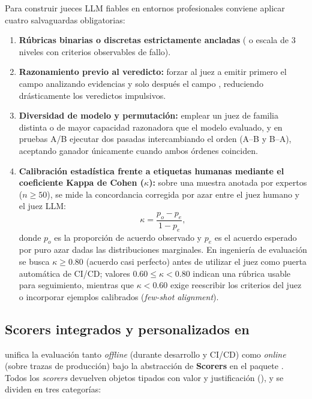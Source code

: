 \begin{infobox}
Para construir jueces LLM fiables en entornos profesionales conviene aplicar cuatro salvaguardas obligatorias:
\begin{enumerate}
  \item \textbf{Rúbricas binarias o discretas estrictamente ancladas} ( o escala de 3 niveles con criterios observables de fallo).
  \item \textbf{Razonamiento previo al veredicto:} forzar al juez a emitir primero el campo  analizando evidencias y solo después el campo , reduciendo drásticamente los veredictos impulsivos.
  \item \textbf{Diversidad de modelo y permutación:} emplear un juez de familia distinta o de mayor capacidad razonadora que el modelo evaluado, y en pruebas A/B ejecutar dos pasadas intercambiando el orden (A--B y B--A), aceptando ganador únicamente cuando ambos órdenes coinciden.
  \item \textbf{Calibración estadística frente a etiquetas humanas mediante el coeficiente Kappa de Cohen ($\kappa$):} sobre una muestra anotada por expertos ($n \ge 50$), se mide la concordancia corregida por azar entre el juez humano y el juez LLM:
  \begin{equation}\label{eq:cohen-kappa}
    \kappa = \frac{p_o - p_e}{1 - p_e},
  \end{equation}
  donde $p_o$ es la proporción de acuerdo observado y $p_e$ es el acuerdo esperado por puro azar dadas las distribuciones marginales. En ingeniería de evaluación se busca $\kappa \ge 0.80$ (acuerdo casi perfecto) antes de utilizar el juez como puerta automática de CI/CD; valores $0.60 \le \kappa < 0.80$ indican una rúbrica usable para seguimiento, mientras que $\kappa < 0.60$ exige reescribir los criterios del juez o incorporar ejemplos calibrados (\textit{few-shot alignment}).
\end{enumerate}
\end{infobox}

\subsection{Scorers integrados y personalizados en \texorpdfstring{}{mlflow.genai}}\label{subsec:scorers-mlflow}

 unifica la evaluación tanto \textit{offline} (durante desarrollo y CI/CD) como \textit{online} (sobre trazas de producción) bajo la abstracción de \textbf{Scorers} en el paquete . Todos los \textit{scorers} devuelven objetos  tipados con valor y justificación (), y se dividen en tres categorías:

